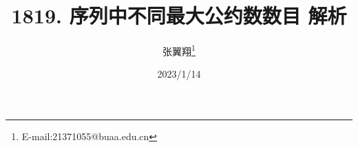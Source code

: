 \documentclass[12pt]{ctexart}
\begin{document}
\title{1819. 序列中不同最大公约数数目 解析}
\author{张翼翔\thanks{E-mail:21371055@buaa.edu.cn}}
\date{2023/1/14}
\end{document}
